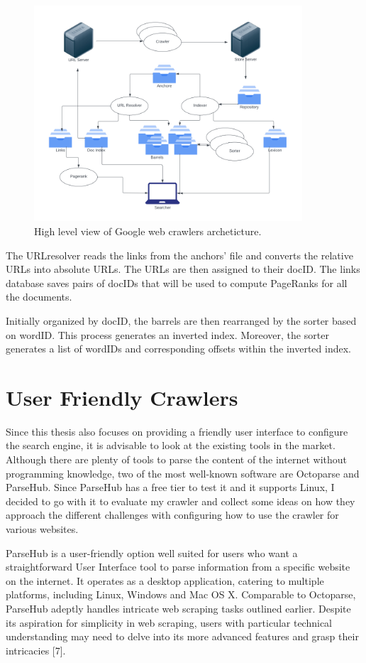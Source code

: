 \begin{figure}[h]	
     \centering
     \includegraphics[width=10cm]{images/google_arch.png}
     \caption{High level view of Google web crawlers archeticture.}
     \label{fig:google-arch}
\end{figure}

The URLresolver reads the links from the anchors' file and converts the relative URLs into absolute URLs. The URLs are then assigned to their docID. The links database saves pairs of docIDs that will be used to compute PageRanks for all the documents. 

Initially organized by docID, the barrels are then rearranged by the sorter based on wordID. This process generates an inverted index. Moreover, the sorter generates a list of wordIDs and corresponding offsets within the inverted index. 

\section{User Friendly Crawlers}
Since this thesis also focuses on providing a friendly user interface to configure the search engine, it is advisable to look at the existing tools in the market. Although there are plenty of tools to parse the content of the internet without programming knowledge, two of the most well-known software are Octoparse and ParseHub. Since ParseHub has a free tier to test it and it supports Linux, I decided to go with it to evaluate my crawler and collect some ideas on how they approach the different challenges with configuring how to use the crawler for various websites. 

ParseHub is a user-friendly option well suited for users who want a straightforward User Interface tool to parse information from a specific website on the internet. It operates as a desktop application, catering to multiple platforms, including Linux, Windows and Mac OS X. Comparable to Octoparse, ParseHub adeptly handles intricate web scraping tasks outlined earlier. Despite its aspiration for simplicity in web scraping, users with particular technical understanding may need to delve into its more advanced features and grasp their intricacies [7].
